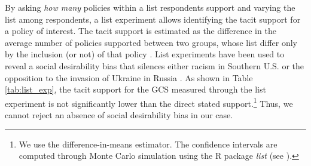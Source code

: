 By asking \textit{how many} policies within a list respondents support and varying the list among respondents, a list experiment allows identifying the tacit support for a policy of interest. The tacit support is estimated as the difference in the average number of policies supported between two groups, whose list differ only by the inclusion (or not) of that policy \citep{hainmueller_causal_2014}. %
List experiments have been used to reveal a social desirability bias that silences either racism in Southern U.S. \citep{kuklinski_racial_1997} or the opposition to the invasion of Ukraine in Russia \citep{chapkovski_solid_2022}. %
As shown in Table \ref{tab:list_exp}, the tacit support for the GCS measured through the list experiment is not significantly lower than the direct stated support.\footnote{We use the difference-in-means estimator. The confidence intervals are computed through Monte Carlo simulation using the R package \textit{list} (see \citealp{imai_multivariate_2011}).} Thus, we cannot reject an absence of social desirability bias in our case.

